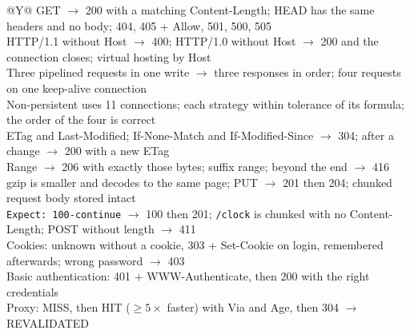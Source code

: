 \documentclass[11pt,a4paper]{article}
\begin{document}
\begin{table}[H]
\centering
\caption{Selected verification checks (all passed)}
\small
\begin{tabularx}{\textwidth}{@{}Y@{}}
\toprule
GET $\rightarrow$ 200 with a matching Content-Length; HEAD has the same headers and no body; 404, 405 + Allow, 501, 500, 505 \\
HTTP/1.1 without Host $\rightarrow$ 400; HTTP/1.0 without Host $\rightarrow$ 200 and the connection closes; virtual hosting by Host \\
Three pipelined requests in one write $\rightarrow$ three responses in order; four requests on one keep-alive connection \\
Non-persistent uses 11 connections; each strategy within tolerance of its formula; the order of the four is correct \\
ETag and Last-Modified; If-None-Match and If-Modified-Since $\rightarrow$ 304; after a change $\rightarrow$ 200 with a new ETag \\
Range $\rightarrow$ 206 with exactly those bytes; suffix range; beyond the end $\rightarrow$ 416 \\
gzip is smaller and decodes to the same page; PUT $\rightarrow$ 201 then 204; chunked request body stored intact \\
\texttt{Expect: 100-continue} $\rightarrow$ 100 then 201; \texttt{/clock} is chunked with no Content-Length; POST without length $\rightarrow$ 411 \\
Cookies: unknown without a cookie, 303 + Set-Cookie on login, remembered afterwards; wrong password $\rightarrow$ 403 \\
Basic authentication: 401 + WWW-Authenticate, then 200 with the right credentials \\
Proxy: MISS, then HIT ($\geq 5\times$ faster) with Via and Age, then 304 $\rightarrow$ REVALIDATED \\ \bottomrule
\end{tabularx}
\end{table}

\end{document}
